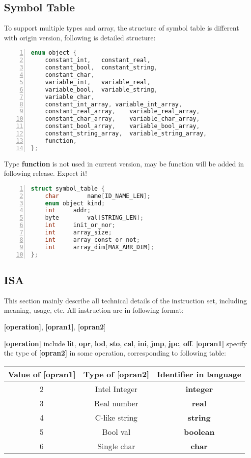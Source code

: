 \documentclass{article}
\begin{document}
		\subsection{Symbol Table}
		To support multiple types and array, the structure of symbol table is different with origin version, following is detailed structure:\\
		\begin{lstlisting}[language={C},numbers=left,numberstyle=\tiny,%frame=shadowbox,  
   rulesepcolor=\color{red!20!green!20!blue!20},  
   keywordstyle=\color{blue!70!black},  
   commentstyle=\color{blue!90!},  
   basicstyle=\ttfamily]  
enum object {
	constant_int,	constant_real,
	constant_bool,	constant_string,
	constant_char,
	variable_int,	variable_real,
	variable_bool,	variable_string,
	variable_char,
	constant_int_array,	variable_int_array,
	constant_real_array,	variable_real_array,
	constant_char_array,	variable_char_array,
	constant_bool_array,	variable_bool_array,
	constant_string_array,	variable_string_array,
	function,
};
		\end{lstlisting}
		Type \textbf{function} is not used in current version, may be function will be added in following release. Expect it!
		\newpage
		\begin{lstlisting}[language={C},numbers=left,numberstyle=\tiny,%frame=shadowbox,  
   rulesepcolor=\color{red!20!green!20!blue!20},  
   keywordstyle=\color{blue!70!black},  
   commentstyle=\color{blue!90!},  
   basicstyle=\ttfamily]  
struct symbol_table {
	char		name[ID_NAME_LEN];
	enum object	kind;
	int		addr;
	byte		val[STRING_LEN];
	int		init_or_nor;
	int		array_size;
	int		array_const_or_not;
	int		array_dim[MAX_ARR_DIM];
};
		\end{lstlisting}
		\subsection{ISA}
		This section mainly describe all technical details of the instruction set, including meaning, usage, etc. All instruction are in following format:
		\begin{center}
		\textbf{[operation]}, \textbf{[opran1]}, \textbf{[opran2]}
		\end{center} 
		\textbf{[operation]} include \textbf{lit}, \textbf{opr}, \textbf{lod}, \textbf{sto}, \textbf{cal}, \textbf{ini}, \textbf{jmp}, \textbf{jpc}, \textbf{off}. \textbf{[opran1]} specify the type of \textbf{[opran2]} in some operation, corresponding to following table:\\
		\begin{center}
			\begin{tabular}{ccc}
			\toprule
			Value of \textbf{[opran1]} & Type of \textbf{[opran2]} & Identifier in language \\
			\midrule
			2 & Intel Integer & \textbf{integer} \\
			3 & Real number & \textbf{real} \\
			4 & C-like string & \textbf{string} \\
			5 & Bool val & \textbf{boolean}\\
			6 & Single char & \textbf{char} \\
			\bottomrule
			\end{tabular}
			\end{center}
\end{document}
